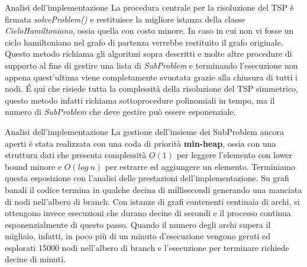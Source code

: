 \documentclass[10pt]{beamer}
\begin{document}
\begin{frame}{Analisi dell'implementazione}
    La procedura centrale per la risoluzione del TSP è firmata \textit{solveProblem()} e restituisce la migliore istanza della classe \textit{CicloHamiltoniano}, ossia quella con costo minore. In caso in cui non vi fosse un ciclo hamiltoniano nel grafo di partenza verrebbe restituito il grafo originale. Questo metodo richiama gli algoritmi sopra descritti e molte altre procedure di supporto al fine di gestire una lista di \textit{SubProblem} e terminando l'esecuzione non appena quest'ultima viene completamente svuotata grazie alla chiusura di tutti i nodi. \'E qui che risiede tutta la complessità della risoluzione del TSP simmetrico, questo metodo infatti richiama sottoprocedure polinomiali in tempo, ma il numero di \textit{SubProblem} che deve gestire può essere esponenziale.
\end{frame}

\begin{frame}{Analisi dell'implementazione}
    La gestione dell'insieme dei SubProblem ancora aperti è stata realizzata con una coda di priorità \textbf{min-heap}, ossia con una struttura dati che presenta complessità $O(1)$ per leggere l'elemento con lower bound minore e $O(log\:n)$ per estrarre ed aggiungere un elemento.
    \newline
    \newline
    Terminiamo questa esposizione con l'analisi delle prestazioni dell'implementazione. Su grafi banali il codice termina in qualche decina di millisecondi generando una manciata di nodi nell'albero di branch. Con istanze di grafi contenenti centinaia di archi, si ottengono invece esecuzioni che durano decine di secondi e il processo continua esponenzialmente di questo passo. Quando il numero degli archi supera il migliaio, infatti, in poco più di un minuto d'esecuzione vengono gerati ed esplorati 15000 nodi nell'albero di branch e l'esecuzione per terminare richiede decine di minuti.
\end{frame}
\end{document}
